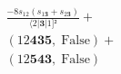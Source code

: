 \documentclass[varwidth, border=5pt]{standalone}
\begin{document}
\begin{my}
$\begin{gathered}
\scriptscriptstyle\frac{-8s_{12}(s_{1𝟑}+s_{2𝟑})}{⟨2|𝟑|1]²} +\\
\scriptscriptstyle(12𝟒𝟑𝟓,\;\text{False}) +\\
\scriptscriptstyle(12𝟓𝟒𝟑,\;\text{False}) \phantom{+}
\end{gathered}$
\end{my}
\end{document}
